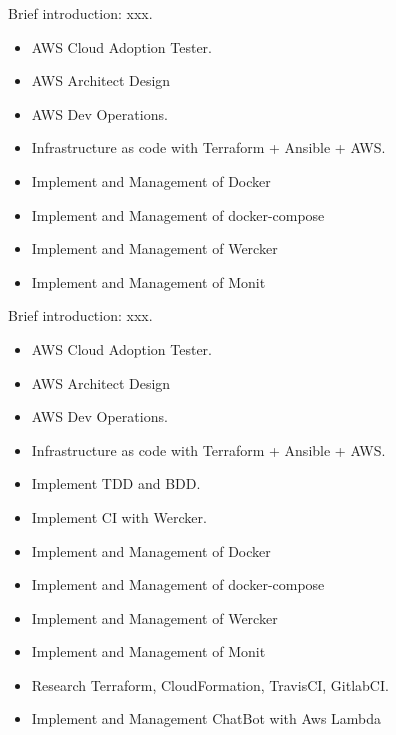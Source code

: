 \documentclass{resume}
\begin{document}
Brief introduction: xxx.
\begin{itemize}
  \item AWS Cloud Adoption Tester.
  \item AWS Architect Design
  \item AWS Dev Operations.
  \item Infrastructure as code with Terraform + Ansible + AWS.
  \item Implement and Management of Docker
  \item Implement and Management of docker-compose
  \item Implement and Management of Wercker
  \item Implement and Management of Monit
\end{itemize}

Brief introduction: xxx.
\begin{itemize}
  \item AWS Cloud Adoption Tester.
  \item AWS Architect Design
  \item AWS Dev Operations.
  \item Infrastructure as code with Terraform + Ansible + AWS.
  \item Implement TDD and BDD.
  \item Implement CI with Wercker.
  \item Implement and Management of Docker
  \item Implement and Management of docker-compose
  \item Implement and Management of Wercker
  \item Implement and Management of Monit
  \item Research Terraform, CloudFormation, TravisCI, GitlabCI.
  \item Implement and Management ChatBot with Aws Lambda
\end{itemize}
\end{document}
